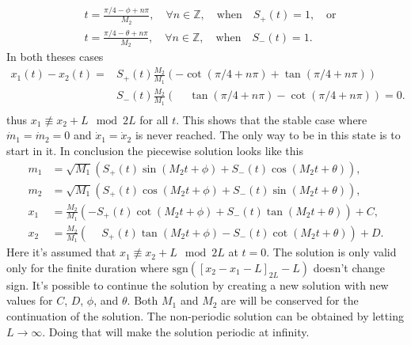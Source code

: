 \documentclass[english,master]{liumaiex}
\theoremstyle{plain}
\theoremstyle{definition}
\newcommand{\sgn}{\text{sgn}}
\begin{document}
\begin{equation}
\begin{aligned}
	&t = \frac{\pi/4 - \phi + n\pi}{M_2}, \quad \forall n \in \mathbb{Z}, \quad \text{when} \quad S_+(t) = 1, \quad \text{or} \\
	&t = \frac{\pi/4 - \theta + n\pi}{M_2}, \quad  \forall n \in \mathbb{Z}, \quad \text{when} \quad S_-(t) = 1.
\end{aligned}
\end{equation}
In both theses cases
\begin{equation}
\begin{aligned}
	x_1(t) - x_2(t) =
	& S_+(t)\frac{M_2}{M_1}(-\cot(\pi/4 + n\pi) + \tan(\pi/4 + n\pi)) \\
	& S_-(t)\frac{M_2}{M_1}(\phantom{-}\tan(\pi/4 + n\pi) - \cot(\pi/4 + n\pi))
	= 0. \\
\end{aligned}
\end{equation}
thus $x_1 \not \equiv x_2 + L \mod 2L$ for all $t$. This shows that the stable case where $\dot{m}_1 = \dot{m}_2 = 0$ and $\dot{x}_1 = \dot{x}_2$ is never reached. The only way to be in this state is to start in it.
%
In conclusion the piecewise solution looks like this
\begin{align}
	m_1 &= \sqrt{M_1} (S_+(t)\sin(M_2 t + \phi) + S_-(t)\cos(M_2 t + \theta)), \\
	m_2 &= \sqrt{M_1} (S_+(t)\cos(M_2 t + \phi) + S_-(t)\sin(M_2 t + \theta)), \\
	x_1 &= \frac{M_2}{M_1}(-S_+(t)\cot(M_2t + \phi) + S_-(t)\tan(M_2t + \theta)) + C,\\
	x_2 &= \frac{M_2}{M_1}(\phantom{-}S_+(t)\tan(M_2t + \phi) - S_-(t)\cot(M_2t + \theta)) + D.
\end{align}
%
Here it's assumed that $x_1 \not \equiv x_2 + L \mod 2L$ at $t = 0$. The solution is only valid only for the finite duration where $\sgn([x_2 - x_1 - L]_{2L} - L)$ doesn't change sign. It's possible to continue the solution by creating a new solution with new values for $C$, $D$, $\phi$, and $\theta$. Both $M_1$ and $M_2$ are will be conserved for the continuation of the solution. The non-periodic solution can be obtained by letting $L \rightarrow \infty$. Doing that will make the solution periodic at infinity.
\end{document}
